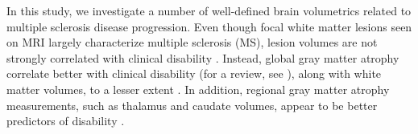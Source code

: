 In this study, we investigate a number of well-defined brain volumetrics related to multiple sclerosis disease progression. Even though focal white matter lesions seen on MRI largely characterize multiple sclerosis (MS), lesion volumes are not strongly correlated with clinical disability \cite{lesions1,lesions2,lesions3}. Instead, global gray matter atrophy correlate better with clinical disability (for a review, see \cite{horakova2012clinical}), along with white matter volumes, to a lesser extent \cite{white1}. In addition, regional gray matter atrophy measurements, such as thalamus \cite{thal1,thal2,thal3,thal4} and caudate \cite{caud1,caud2} volumes, appear to be better predictors of disability \cite{gm1,gm2,gm3,gm4}.   %